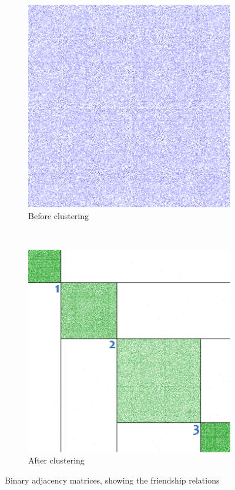 \begin{figure}
\centering
\begin{subfigure}[b]{0.6\textwidth}
\includegraphics[width=\linewidth]{graphics/pre-cluster}
\caption{Before clustering}
\label{fig:pre-cluster}
\end{subfigure}\\

\begin{subfigure}[b]{0.6\textwidth}
\includegraphics[width=\linewidth]{graphics/cluster}
\caption{After clustering}
\label{fig:cluster}
\end{subfigure}

\caption{Binary adjacency matrices, showing the friendship relations}
\end{figure}

